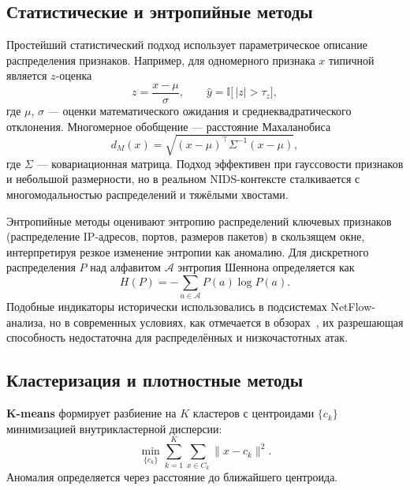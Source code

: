 \subsection{Статистические и энтропийные методы}

Простейший статистический подход использует параметрическое описание
распределения признаков. Например, для одномерного признака \(x\) типичной
является \(z\)-оценка
\begin{equation}
z = \frac{x - \mu}{\sigma},
\qquad
\hat{y} = \mathbb{I}\bigl[\,|z| > \tau_z\bigr],
\label{eq:zscore}
\end{equation}
где \(\mu\), \(\sigma\) --- оценки математического ожидания и
среднеквадратического отклонения. Многомерное обобщение --- расстояние
Махаланобиса
\begin{equation}
d_M(x) = \sqrt{(x-\mu)^{\top}\Sigma^{-1}(x-\mu)},
\label{eq:mahalanobis}
\end{equation}
где \(\Sigma\) --- ковариационная матрица. Подход эффективен при
гауссовости признаков и небольшой размерности, но в реальном NIDS-контексте
сталкивается с многомодальностью распределений и тяжёлыми хвостами.

Энтропийные методы оценивают энтропию распределений ключевых признаков
(распределение IP-адресов, портов, размеров пакетов) в скользящем окне,
интерпретируя резкое изменение энтропии как аномалию. Для дискретного
распределения \(P\) над алфавитом \(\mathcal{A}\) энтропия Шеннона определяется
как
\begin{equation}
H(P) = -\sum_{a \in \mathcal{A}} P(a)\log P(a).
\label{eq:entropy}
\end{equation}
Подобные индикаторы исторически использовались в подсистемах NetFlow-анализа,
но в современных условиях, как отмечается в обзорах~\cite{khraisat2019survey,
ferrag2020dlcyber}, их разрешающая способность недостаточна для распределённых
и низкочастотных атак.

\subsection{Кластеризация и плотностные методы}

\textbf{K-means} формирует разбиение на \(K\) кластеров с центроидами
\(\{c_k\}\) минимизацией внутрикластерной дисперсии:
\begin{equation}
\min_{\{c_k\}}\sum_{k=1}^{K}\sum_{x \in C_k}\|x - c_k\|^{2}.
\label{eq:kmeans}
\end{equation}
Аномалия определяется через расстояние до ближайшего центроида.

